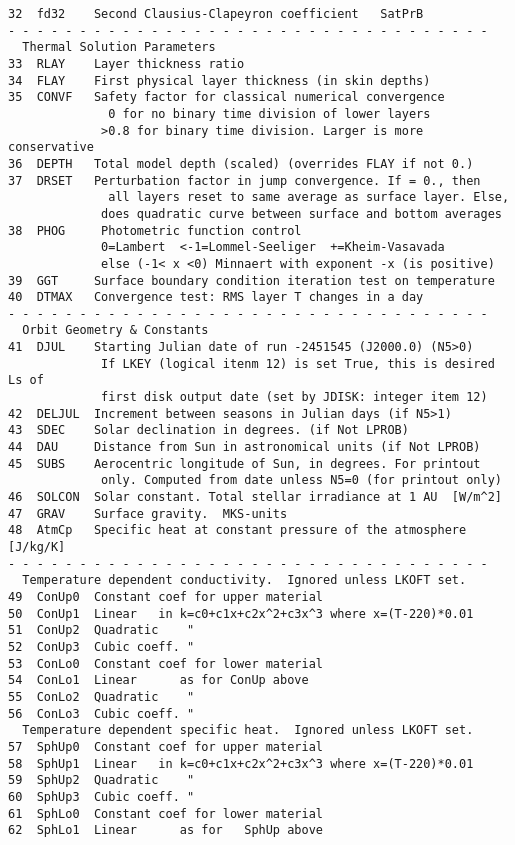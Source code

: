 \documentclass{article}
\begin{document}
\begin{verbatim}
32  fd32    Second Clausius-Clapeyron coefficient   SatPrB
- - - - - - - - - - - - - - - - - - - - - - - - - - - - - - - - - - 
  Thermal Solution Parameters
33  RLAY    Layer thickness ratio
34  FLAY    First physical layer thickness (in skin depths)
35  CONVF   Safety factor for classical numerical convergence
              0 for no binary time division of lower layers
             >0.8 for binary time division. Larger is more conservative
36  DEPTH   Total model depth (scaled) (overrides FLAY if not 0.)
37  DRSET   Perturbation factor in jump convergence. If = 0., then
              all layers reset to same average as surface layer. Else,
             does quadratic curve between surface and bottom averages
38  PHOG     Photometric function control
             0=Lambert  <-1=Lommel-Seeliger  +=Kheim-Vasavada
             else (-1< x <0) Minnaert with exponent -x (is positive)
39  GGT     Surface boundary condition iteration test on temperature
40  DTMAX   Convergence test: RMS layer T changes in a day
- - - - - - - - - - - - - - - - - - - - - - - - - - - - - - - - - - 
  Orbit Geometry & Constants
41  DJUL    Starting Julian date of run -2451545 (J2000.0) (N5>0)
             If LKEY (logical itenm 12) is set True, this is desired Ls of 
             first disk output date (set by JDISK: integer item 12)
42  DELJUL  Increment between seasons in Julian days (if N5>1)
43  SDEC    Solar declination in degrees. (if Not LPROB)
44  DAU     Distance from Sun in astronomical units (if Not LPROB)
45  SUBS    Aerocentric longitude of Sun, in degrees. For printout 
             only. Computed from date unless N5=0 (for printout only)
46  SOLCON  Solar constant. Total stellar irradiance at 1 AU  [W/m^2]
47  GRAV    Surface gravity.  MKS-units
48  AtmCp   Specific heat at constant pressure of the atmosphere [J/kg/K]
- - - - - - - - - - - - - - - - - - - - - - - - - - - - - - - - - - 
  Temperature dependent conductivity.  Ignored unless LKOFT set.
49  ConUp0  Constant coef for upper material 
50  ConUp1  Linear   in k=c0+c1x+c2x^2+c3x^3 where x=(T-220)*0.01
51  ConUp2  Quadratic    " 
52  ConUp3  Cubic coeff. "
53  ConLo0  Constant coef for lower material 
54  ConLo1  Linear      as for ConUp above
55  ConLo2  Quadratic    "
56  ConLo3  Cubic coeff. "
  Temperature dependent specific heat.  Ignored unless LKOFT set.
57  SphUp0  Constant coef for upper material 
58  SphUp1  Linear   in k=c0+c1x+c2x^2+c3x^3 where x=(T-220)*0.01
59  SphUp2  Quadratic    " 
60  SphUp3  Cubic coeff. "
61  SphLo0  Constant coef for lower material 
62  SphLo1  Linear      as for   SphUp above

\end{verbatim}
\end{document}
